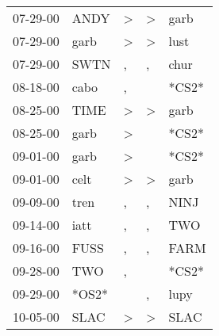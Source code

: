 \begin{supertabular}{p{0.07\textwidth}p{0.06\textwidth}p{0.02\textwidth}p{0.02\textwidth}p{0.06\textwidth}}
          07-29-00\textsuperscript{} &           ANDY\textsuperscript{} &     \textgreater &     \textgreater &           garb\textsuperscript{} \\
          07-29-00\textsuperscript{} &           garb\textsuperscript{} &     \textgreater &     \textgreater &           lust\textsuperscript{} \\
          07-29-00\textsuperscript{} &           SWTN\textsuperscript{} &                , &                , &           chur\textsuperscript{} \\
          08-18-00\textsuperscript{} &           cabo\textsuperscript{} &                , &                  &                            *CS2* \\
          08-25-00\textsuperscript{} &           TIME\textsuperscript{} &     \textgreater &     \textgreater &           garb\textsuperscript{} \\
          08-25-00\textsuperscript{} &           garb\textsuperscript{} &     \textgreater &                  &                            *CS2* \\
          09-01-00\textsuperscript{} &           garb\textsuperscript{} &     \textgreater &                  &                            *CS2* \\
          09-01-00\textsuperscript{} &           celt\textsuperscript{} &     \textgreater &     \textgreater &           garb\textsuperscript{} \\
          09-09-00\textsuperscript{} &           tren\textsuperscript{} &                , &                , &           NINJ\textsuperscript{} \\
          09-14-00\textsuperscript{} &           iatt\textsuperscript{} &                , &                , &            TWO\textsuperscript{} \\
          09-16-00\textsuperscript{} &           FUSS\textsuperscript{} &                , &                , &           FARM\textsuperscript{} \\
          09-28-00\textsuperscript{} &            TWO\textsuperscript{} &                , &                  &                            *CS2* \\
          09-29-00\textsuperscript{} &                            *OS2* &                  &                , &           lupy\textsuperscript{} \\
          10-05-00\textsuperscript{} &           SLAC\textsuperscript{} &     \textgreater &     \textgreater &           SLAC\textsuperscript{} \\

\end{supertabular}
